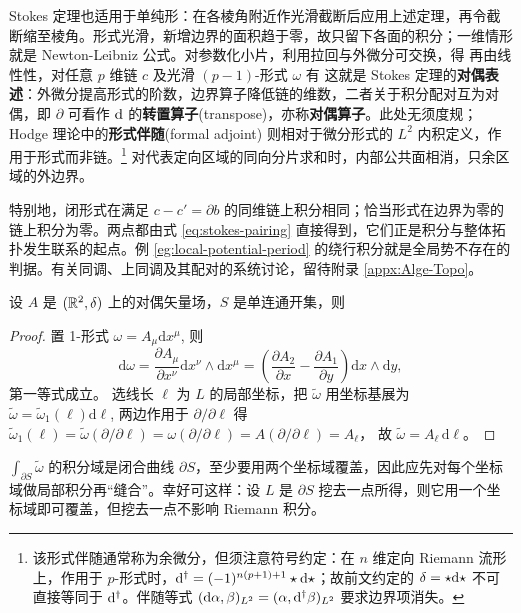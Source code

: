 Stokes 定理也适用于单纯形：在各棱角附近作光滑截断后应用上述定理，再令截断缩至棱角。形式光滑，新增边界的面积趋于零，故只留下各面的积分；一维情形就是 Newton-Leibniz 公式。对参数化小片，利用拉回与外微分可交换，得
再由线性性，对任意 $p$ 维链 $c$ 及光滑 $(p-1)$-形式 $\omega$ 有
这就是 Stokes 定理的\textbf{对偶表述}：外微分提高形式的阶数，边界算子降低链的维数，二者关于积分配对互为对偶，即 $\partial$ 可看作 $\dd$ 的\textbf{转置算子}(transpose)，亦称\textbf{对偶算子}。此处无须度规；Hodge 理论中的\textbf{形式伴随}(formal adjoint) 则相对于微分形式的 $L^2$ 内积定义，作用于形式而非链。\footnote{该形式伴随通常称为余微分，但须注意符号约定：在 $n$ 维定向 Riemann 流形上，作用于 $p$-形式时，$\dd^\dagger=(-1)^{n(p+1)+1}\star\dd\star$；故前文约定的 $\delta=\star\dd\star$ 不可直接等同于 $\dd^\dagger$。伴随等式 $(\dd\alpha,\beta)_{L^2}=(\alpha,\dd^\dagger\beta)_{L^2}$ 要求边界项消失。}
对代表定向区域的同向分片求和时，内部公共面相消，只余区域的外边界。

特别地，闭形式在满足 $c-c'=\partial b$ 的同维链上积分相同；恰当形式在边界为零的链上积分为零。两点都由式 \eqref{eq:stokes-pairing} 直接得到，它们正是积分与整体拓扑发生联系的起点。例 \ref{eg:local-potential-period} 的绕行积分就是全局势不存在的判据。有关同调、上同调及其配对的系统讨论，留待附录 \ref{appx:Alge-Topo}。

\begin{example}[Green]
    设 $A$ 是 $(\mathbb{R}^2,\delta)$ 上的对偶矢量场，$S$ 是单连通开集，则
\end{example}
\begin{proof}
    置 1-形式 $\omega=A_\mu\mathrm{d} x^\mu$, 则
\[\mathrm{d} \omega  =\frac{\partial A_\mu}{\partial x^\nu} \mathrm{d} x^\nu \wedge \mathrm{d} x^\mu=\left(\frac{\partial A_2}{\partial x}-\frac{\partial A_1}{\partial y}\right) \mathrm{d} x \wedge \mathrm{d} y,\]
第一等式成立。
选线长 $\ell$ 为 $L$ 的局部坐标，把 $\tilde{\omega}$ 用坐标基展为 $\tilde{\omega}=\tilde{\omega}_1(\ell)\mathrm{d} \ell$, 两边作用于 $\partial / \partial \ell$ 得
$\tilde{\omega}_1(\ell)=\tilde{\omega}(\partial / \partial \ell)=\omega(\partial / \partial \ell)=A(\partial / \partial \ell)=A_\ell$，
故 $\tilde{\omega}=A_\ell\, \mathrm{d} \ell$。
\end{proof}
\begin{remark}
    $\int_{\partial S} \tilde{\omega}$ 的积分域是闭合曲线 $\partial S$，至少要用两个坐标域覆盖，因此应先对每个坐标域做局部积分再“缝合”。幸好可这样：设 $L$ 是 $\partial S$ 挖去一点所得，则它用一个坐标域即可覆盖，但挖去一点不影响 Riemann 积分。
\end{remark}

